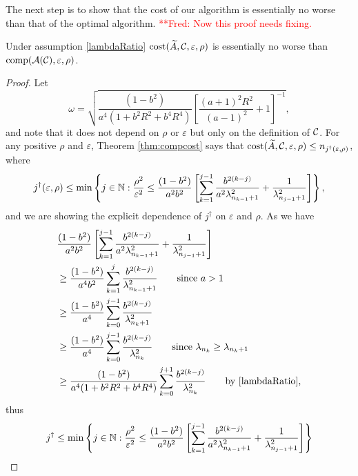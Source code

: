 \documentclass[graybox,footinfo]{svmult}
\newcommand{\frednote}[1]{  {\textcolor{red}  {\mbox{**Fred:} #1}}}
\begin{document}
The next step is to show that the cost of our algorithm is essentially no worse than that of the optimal algorithm.
\frednote{Now this proof needs fixing.}
\begin{theorem}
\label{thm:CostNoWorse}
Under assumption \eqref{lambdaRatio} $\textup{cost}(\widetilde{A},{\mathcal{C}}, \varepsilon,\rho)$ is essentially no worse than $\textup{comp}({\mathcal{A}}({\mathcal{C}}),\varepsilon,\rho)$. 
\end{theorem}
\begin{proof}
Let  
\begin{equation} \label{omegadef}
    \omega = \sqrt{\frac{(1 - b^2)}{a^4(1 + b^2R^2 + b^4R^4)}\left[\frac{(a+1)^{2} R^2 }{(a-1)^2} + 1\right]^{-1}},
\end{equation}
and note that it does not depend on $\rho$ or $\varepsilon$ but only on the definition of ${\mathcal{C}}$. 
For any positive $\rho$ and $\varepsilon$, Theorem \ref{thm:compcost} says that $\textup{cost}(\widetilde{A},{\mathcal{C}},\varepsilon,\rho) \le n_{j^\dagger(\varepsilon,\rho)}$, where 
\[
j^\dagger(\varepsilon,\rho) \le \min \left \{j \in {\mathbb{N}} : \frac{\rho^2}{\varepsilon^2} \le \frac{(1 - b^2)}{a^2b^2} \left[ \sum_{k=1}^{j-1} \frac{b^{2(k-j)}}{a^2\lambda_{n_{k-1}+1}^2} + \frac{1}{\lambda_{n_{j-1}+1}^2}\right]   \right\}, \]
and we are showing the explicit dependence of $j^\dagger$ on $\varepsilon$ and $\rho$.  As we have
\begin{align*} 
 & \frac{(1 - b^2)}{a^2b^2} \left[ \sum_{k=1}^{j-1} \frac{b^{2(k-j)}}{a^2\lambda_{n_{k-1}+1}^2} + \frac{1}{\lambda_{n_{j-1}+1}^2}\right]   \\
&\ge  \frac{(1 - b^2)}{a^4b^2} \sum_{k=1}^{j} \frac{b^{2(k-j)}}{\lambda_{n_{k-1}+1}^2}  \qquad \text{since } a > 1\\
&\ge  \frac{(1 - b^2)}{a^4} \sum_{k=0}^{j-1} \frac{b^{2(k-j)}}{\lambda_{n_{k}+1}^2}  \\
&\ge  \frac{(1 - b^2)}{a^4} \sum_{k=0}^{j-1} \frac{b^{2(k-j)}}{\lambda_{n_{k}}^2}  \qquad \text{since } \lambda_{n_k} \ge \lambda_{n_k+1}\\
&\ge  \frac{(1 - b^2)}{a^4(1 + b^2R^2 + b^4R^4)} \sum_{k=0}^{j+1} \frac{b^{2(k-j)}}{\lambda_{n_{k}}^2}  \qquad \text{by \eqref{lambdaRatio},}
\end{align*}
thus 
\begin{align*} 
j^\dagger &\le \min \left \{j \in \bbN : \frac{\rho^2}{\varepsilon^2} \le \frac{(1 - b^2)}{a^2b^2} \left[ \sum_{k=1}^{j-1} \frac{b^{2(k-j)}}{a^2\lambda_{n_{k-1}+1}^2} + \frac{1}{\lambda_{n_{j-1}+1}^2}\right]   \right\} \\

\end{align*}
\end{proof}
\end{document}
